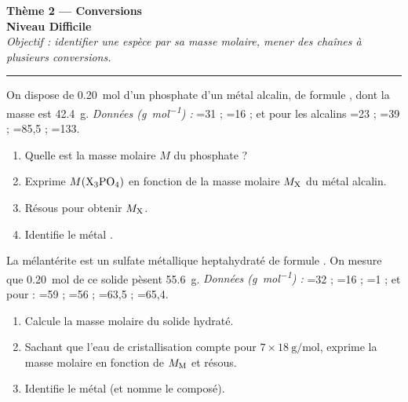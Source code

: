 \documentclass[11pt,a4paper]{article}
\newcommand{\gmol}{\si{\gram\per\mole}}
\begin{document}
\begin{center}
{\LARGE\bfseries\color{primarydark}Thème 2 — Conversions}\\[1pt]
{\large\color{difcol}\textbf{Niveau Difficile}}\\[2pt]
{\itshape Objectif : identifier une espèce par sa masse molaire, mener des chaînes à plusieurs conversions.}\\
{\color{primary}\rule{0.6\linewidth}{1pt}}
\end{center}

\begin{exo}
On dispose de \SI{0,20}{\mole} d'un phosphate d'un métal alcalin, de formule , dont la
masse est \SI{42,4}{\gram}. \emph{Données (\gmol) :} =31 ; =16 ; et pour les alcalins
=23 ; =39 ; =85{,}5 ; =133.
\begin{enumerate}[label=\textbf{\alph*)},leftmargin=2em,topsep=1pt,itemsep=1.5pt]
  \item Quelle est la masse molaire $M$ du phosphate  ?
  \item Exprime $M(\ce{X3PO4})$ en fonction de la masse molaire $M_{\ce{X}}$ du métal alcalin.
  \item Résous pour obtenir $M_{\ce{X}}$.
  \item Identifie le métal .
\end{enumerate}
\end{exo}

\begin{exo}
La mélantérite est un sulfate métallique heptahydraté de formule . On mesure que
\SI{0,20}{\mole} de ce solide pèsent \SI{55,6}{\gram}. \emph{Données (\gmol) :} =32 ;
=16 ; =1 ; et pour  : =59 ; =56 ; =63{,}5 ; =65{,}4.
\begin{enumerate}[label=\textbf{\alph*)},leftmargin=2em,topsep=1pt,itemsep=1.5pt]
  \item Calcule la masse molaire du solide hydraté.
  \item Sachant que l'eau de cristallisation compte pour $7\times\SI{18}{\gram\per\mole}$, exprime la
        masse molaire en fonction de $M_{\ce{M}}$ et résous.
  \item Identifie le métal  (et nomme le composé).
\end{enumerate}
\end{exo}
\end{document}
